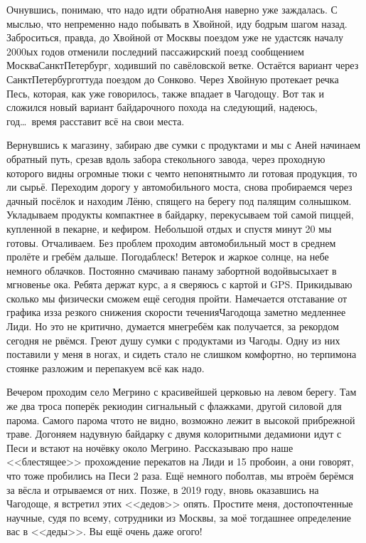Очнувшись, понимаю, что надо идти обратно\mdash Аня наверно уже заждалась. С мыслью, что непременно надо побывать в Хвойной, иду бодрым шагом назад. Заброситься, правда, до Хвойной от Москвы поездом уже не удастся\mdash к началу 2000\sdash ых годов отменили последний пассажирский поезд сообщением Москва\mdash Санкт\sdash Петербург, ходивший по савёловской ветке. Остаётся вариант через Санкт\sdash Петербург\mdash оттуда поездом до Сонково. Через Хвойную протекает речка Песь, которая, как уже говорилось, также впадает в Чагодощу. Вот так и сложился новый вариант байдарочного похода на следующий, надеюсь, год\ldots~время расставит всё на свои места.

Вернувшись к магазину, забираю две сумки с продуктами и мы с Аней начинаем обратный путь, срезав вдоль забора стекольного завода, через проходную которого видны огромные тюки с чем\sdash то непонятным\mdash то ли готовая продукция, то ли сырьё. Переходим дорогу у автомобильного моста, снова пробираемся через дачный посёлок и находим Лёню, спящего на берегу под палящим солнышком. Укладываем продукты компактнее в байдарку, перекусываем той самой пиццей, купленной в пекарне, и кефиром. Небольшой отдых и спустя минут 20 мы готовы. Отчаливаем. Без проблем проходим автомобильный мост в среднем пролёте и гребём дальше. Погода\mdash блеск! Ветерок и жаркое солнце, на небе немного облачков. Постоянно смачиваю панаму забортной водой\mdash высыхает в мгновенье ока. 
\newpage
Ребята держат курс, а я сверяюсь с картой и GPS. Прикидываю сколько мы физически сможем ещё сегодня пройти. Намечается отставание от графика из\sdash за резкого снижения скорости течения\mdash Чагодоща заметно медленнее Лиди. Но это не критично, думается мне\mdash гребём как получается, за рекордом сегодня не рвёмся. Греют душу сумки с продуктами из Чагоды. Одну из них поставили у меня в ногах, и сидеть стало не слишком комфортно, но терпимо\mdash на стоянке разложим и перепакуем всё как надо. 

Вечером проходим село Мегрино с красивейшей церковью на левом берегу. Там же два троса поперёк реки\mdash один сигнальный с флажками, другой силовой для парома. Самого парома что\sdash то не видно, возможно лежит в высокой прибрежной траве. Догоняем надувную байдарку с двумя колоритными дедами\mdash они идут с Песи и встают на ночёвку около Мегрино. Рассказываю про наше <<блестящее>> прохождение перекатов на Лиди и 15 пробоин, а они говорят, что тоже пробились на Песи 2 раза. Ещё немного поболтав, мы втроём берёмся за вёсла и отрываемся от них. Позже, в 2019 году, вновь оказавшись на Чагодоще, я встретил этих <<дедов>> опять. Простите меня, достопочтенные научные, судя по всему, сотрудники из Москвы, за моё тогдашнее определение вас в <<деды>>. Вы ещё очень даже ого\sdash го!


